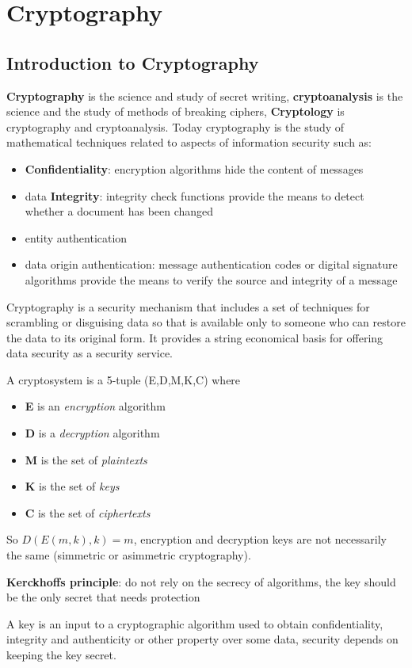 \section{Cryptography}
    \subsection{Introduction to Cryptography}
    \textbf{Cryptography} is the science and study of secret writing, \textbf{cryptoanalysis} is the science and the study of methods of breaking ciphers, \textbf{Cryptology} is cryptography and cryptoanalysis. Today cryptography is the study of mathematical techniques related to aspects of information security such as:
    \begin{itemize}
        \item \textbf{Confidentiality}: encryption algorithms hide the content of messages
        \item data \textbf{Integrity}: integrity check functions provide the means to detect whether a document has been changed
        \item entity authentication 
        \item data origin authentication: message authentication codes or digital signature algorithms provide the means to verify the source and integrity of a message
    \end{itemize}
    Cryptography is a security mechanism that includes a set of techniques for scrambling or disguising data so that is available only to someone who can restore the data to its original form. It provides a string economical basis for offering data security as a security service.
    
    A cryptosystem is a 5-tuple (E,D,M,K,C) where
    \begin{itemize}
        \item \textbf{E} is an \textit{encryption} algorithm
        \item \textbf{D} is a \textit{decryption} algorithm
        \item \textbf{M} is the set of \textit{plaintexts}
        \item \textbf{K} is the set of \textit{keys} 
        \item \textbf{C} is the set of \textit{ciphertexts}
    \end{itemize}
    
    So $D(E(m,k),k)=m$, encryption and decryption keys are not necessarily the same (simmetric or asimmetric cryptography).
    
    \textbf{Kerckhoffs principle}: do not rely on the secrecy of algorithms, the key should be the only secret that needs protection
    
    A key is an input to a cryptographic algorithm used to obtain confidentiality, integrity and authenticity or other property over some data, security depends on keeping the key secret.
    
